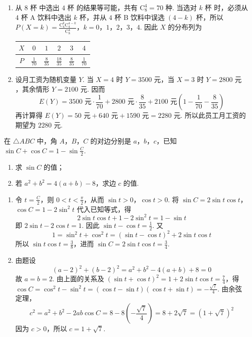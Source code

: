 \begin{solution}
\begin{enumerate}
\item 从 \(8\text{ 杯}\) 中选出 \(4\text{ 杯}\) 的结果等可能，共有 \(\mathrm C_8^4=70\) 种. 当选对 \(k\text{ 杯}\) 时，必须从 \(4\text{ 杯}\) A 饮料中选出 \(k\text{ 杯}\)，并从 \(4\text{ 杯}\) B 饮料中误选 \((4-k)\text{ 杯}\)，所以
\(P(X=k)=\frac{\mathrm C_4^k\mathrm C_4^{4-k}}{\mathrm C_8^4}\)，\(k=0\)，\(1\)，\(2\)，\(3\)，\(4\).
因此 \(X\) 的分布列为
\begin{center}
\begin{tabular}{c|ccccc}
\(X\) & \(0\) & \(1\) & \(2\) & \(3\) & \(4\) \\
\hline
\(P\) & \(\frac{1}{70}\) & \(\frac{8}{35}\) & \(\frac{18}{35}\) & \(\frac{8}{35}\) & \(\frac{1}{70}\)
\end{tabular}
\end{center}

\item 设月工资为随机变量 \(Y\). 当 \(X=4\) 时 \(Y=3500\text{ 元}\)，当 \(X=3\) 时 \(Y=2800\text{ 元}\)，其余情形 \(Y=2100\text{ 元}\). 因而
\[
E(Y)=3500\text{ 元}\cdot\frac{1}{70}+2800\text{ 元}\cdot\frac{8}{35}+2100\text{ 元}\left(1-\frac{1}{70}-\frac{8}{35}\right)
\]
再计算得 \(E(Y)=50\text{ 元}+640\text{ 元}+1590\text{ 元}=2280\text{ 元}\).
所以此员工月工资的期望为 \(2280\text{ 元}\).
\end{enumerate}
\end{solution}

\begin{problem}
在 \(\triangle ABC\) 中，角 \(A\)，\(B\)，\(C\) 的对边分别是 \(a\)，\(b\)，\(c\)，已知 \(\sin C + \cos C = 1 - \sin \frac{C}{2}\).
\begin{enumerate}
\item 求 \(\sin C\) 的值；
\item 若 \(a^2 + b^2 = 4(a + b) - 8\)，求边 \(c\) 的值.
\end{enumerate}
\end{problem}

\begin{solution}
\begin{enumerate}
\item 令 \(t=\frac{C}{2}\)，则 \(0<t<\frac{\pi}{2}\)，从而 \(\sin t>0\)，\(\cos t>0\). 将
\(\sin C=2\sin t\cos t\)，\(\cos C=1-2\sin^2t\) 代入已知等式，得
\[
2\sin t\cos t+1-2\sin^2t=1-\sin t
\]
即 \(2\sin t-2\cos t=1\). 因此
\(\sin t-\cos t=\frac{1}{2}\). 又
\[
1=\sin^2t+\cos^2t=(\sin t-\cos t)^2+2\sin t\cos t
\]
所以 \(\sin t\cos t=\frac{3}{8}\)，进而
\(\sin C=2\sin t\cos t=\frac{3}{4}\).

\item 由题设
\[
(a-2)^2+(b-2)^2=a^2+b^2-4(a+b)+8=0
\]
故 \(a=b=2\). 由上面的关系及
\((\sin t+\cos t)^2=1+2\sin t\cos t=\frac{7}{4}\)，得
\(\cos C=\cos^2t-\sin^2t=(\cos t-\sin t)(\cos t+\sin t)=-\frac{\sqrt7}{4}\).
由余弦定理，
\[
c^2=a^2+b^2-2ab\cos C=8-8\left(-\frac{\sqrt7}{4}\right)=8+2\sqrt7=(1+\sqrt7)^2
\]
因为 \(c>0\)，所以 \(c=1+\sqrt7\).
\end{enumerate}
\end{solution}

